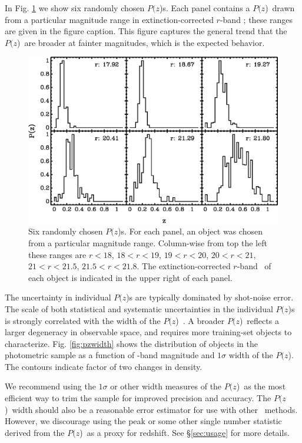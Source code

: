 \documentclass[12pt,preprint]{aastex}
\newcommand{\pofz}{$P(z$)}
\begin{document}
In Fig. \ref{fig:rand6pofz} we show six randomly chosen \pofz s.  Each panel
contains a \pofz\ drawn from a particular magnitude range in extinction-corrected
$r$-band \cmodelmag; these ranges are given in the figure caption.
This figure captures the general trend that the \pofz\ are broader at
fainter magnitudes, which is the expected behavior.

\begin{figure} [t]\centering
    \includegraphics[scale=0.7]{figures/seed25-5-6pofz.eps}
    \caption{Six randomly chosen \pofz s.  For each panel, an object was
    chosen from a particular magnitude range.  Column-wise from top the
    left these ranges are $r < 18$, $18 < r < 19$, $19 < r < 20$, 
    $20 < r < 21$, $21 < r < 21.5$, $21.5 < r < 21.8$.  
    The extinction-corrected $r$-band \cmodelmag\ of each object
    is indicated in the upper right of each panel.
    \label{fig:rand6pofz}}
\end{figure}

The uncertainty in individual \pofz s are typically dominated by shot-noise
error.  The scale of both statistical and systematic uncertainties in the
individual \pofz s is strongly correlated with the width of the \pofz\
\citep{CunhaPhotoz09}.  A broader \pofz\ reflects a larger degeneracy in
observable space, and requires more training-set objects to characterize.  Fig.
\ref{fig:pzwidth} shows the distribution of objects in the photometric sample
as a function of \rmag-band magnitude and $1 \sigma$ width of the \pofz.  The
contours indicate factor of two changes in density.  

We recommend using the $1 \sigma$ or other width measures of the \pofz\ as the
most efficient way to trim the sample for improved precision and accuracy.  The
\pofz\ width should also be a reasonable error estimator for use with other
\photoz\ methods.  However, we discourage using the peak or some other single
number statistic derived from the \pofz\ as a proxy for redshift. See 
\S \ref{sec:usage} for more details.

\end{document}
